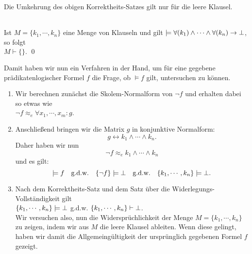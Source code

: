 \noindent
Die Umkehrung des obigen Korrektheits-Satzes gilt nur f\"{u}r die leere Klausel.
\begin{Satz} \hspace*{\fill} \\
  Ist $M = \{k_1,\cdots,k_n\}$ eine Menge von Klauseln und gilt 
  $\models \forall(k_1) \wedge \cdots \wedge \forall(k_n) \rightarrow \bot$, so folgt \\[0.2cm]
  \hspace*{1.3cm} $M \vdash \{\}$.
    \qed
\end{Satz}
\noindent
Damit haben wir nun ein Verfahren in der Hand, um f\"{u}r eine gegebene 
pr\"{a}dikatenlogischer Formel $f$ die Frage, ob $\models f$ gilt, untersuchen zu k\"{o}nnen.
\begin{enumerate}
\item Wir berechnen zun\"{a}chst die Skolem-Normalform von $\neg f$ und erhalten dabei so etwas wie \\[0.2cm]
      \hspace*{1.3cm} $\neg f \approx_e \forall x_1, \cdots, x_m \colon g$.
\item Anschlie\ss{}end bringen wir die Matrix $g$ in konjunktive Normalform: 
      \[ g \leftrightarrow k_1 \wedge \cdots \wedge k_n. \]
      Daher haben wir nun 
      \[ \neg f \approx_e k_1 \wedge \cdots \wedge k_n \] 
      und es gilt: 
      \[  
          \models f                           \quad \mbox{g.d.w.} \quad
          \{\neg f\} \models \bot          \quad \mbox{g.d.w.} \quad 
          \{k_1,\cdots,k_n\} \models \bot.
      \]
\item Nach dem Korrektheits-Satz und dem Satz \"{u}ber die Widerlegungs-Vollst\"{a}ndigkeit gilt
      \\[0.2cm]
      \hspace*{1.3cm} 
      $\{k_1,\cdots,k_n\} \models \bot$ \quad g.d.w. \quad 
      $\{k_1,\cdots,k_n\} \vdash \bot$. \\[0.2cm]
      Wir versuchen also, nun die Widerspr\"{u}chlichkeit der Menge $M = \{ k_1, \cdots, k_n \}$  zu zeigen, indem wir
      aus $M$ die leere Klausel ableiten.
      Wenn diese gelingt, haben wir damit die Allgemeing\"{u}ltigkeit der urspr\"{u}nglich
      gegebenen Formel $f$ gezeigt.
\end{enumerate}

